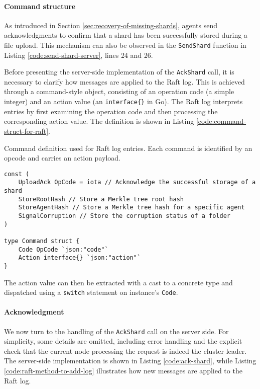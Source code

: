 \paragraph{Command structure}

As introduced in Section \ref{sec:recovery-of-missing-shards}, agents send acknowledgments to confirm that a shard has been successfully stored during a file upload. This mechanism can also be observed in the \texttt{SendShard} function in Listing \ref{code:send-shard-server}, lines 24 and 26.

Before presenting the server-side implementation of the \texttt{AckShard} call,
it is necessary to clarify how messages are applied to the Raft log. This is
achieved through a command-style object, consisting of an operation code (a
simple integer) and an action value (an \texttt{interface\{\}} in Go). The Raft log interprets entries by first examining the operation code and then processing the corresponding action value. The definition is shown in Listing \ref{code:command-struct-for-raft}.

\begin{listing}[H]
\caption{Command definition used for Raft log entries. Each command is identified by an opcode and carries an action payload.}
\label{code:command-struct-for-raft}
\begin{verbatim}
const (
    UploadAck OpCode = iota // Acknowledge the successful storage of a shard
    StoreRootHash // Store a Merkle tree root hash
    StoreAgentHash // Store a Merkle tree hash for a specific agent
    SignalCorruption // Store the corruption status of a folder
)

type Command struct {
    Code OpCode `json:"code"`
    Action interface{} `json:"action"`
}
\end{verbatim}
\end{listing}

The action value can then be extracted with a cast to a concrete type and
dispatched using a \texttt{switch} statement on instance's \texttt{Code}.

\paragraph{Acknowledgment}

We now turn to the handling of the \texttt{AckShard} call on the server side. For simplicity, some details are omitted, including error handling and the explicit check that the current node processing the request is indeed the cluster leader. The server-side implementation is shown in Listing \ref{code:ack-shard}, while Listing \ref{code:raft-method-to-add-log} illustrates how new messages are applied to the Raft log.

